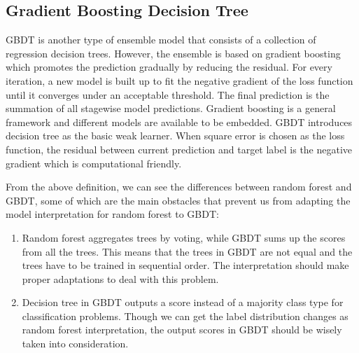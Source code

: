 
\subsection{Gradient Boosting Decision Tree}
GBDT is another type of ensemble model that consists of a collection of 
regression decision trees.
However, the ensemble is based on gradient boosting which promotes the prediction gradually by reducing the residual.
For every iteration, a new model is built up to fit the negative gradient of the loss function until it converges under an acceptable threshold. 
The final prediction is the summation of all stagewise model predictions. Gradient boosting is a general framework and different models 
are available to be embedded. GBDT introduces decision tree as the basic weak learner.  When square error is chosen as the 
loss function, the residual between current prediction and target label is the negative gradient which is computational friendly.

From the above definition, we can see the differences between random forest and GBDT, some of which are the main obstacles that prevent us from adapting 
the model interpretation for random forest to GBDT:
\begin{enumerate}
\item Random forest aggregates trees by voting, while GBDT sums up the scores 
from all the trees. This means that the trees in GBDT are not equal
and the trees have to be trained in sequential order. 
The interpretation should make proper adaptations to deal with this problem.
\item Decision tree in GBDT outputs a score instead of a majority class type for classification problems. Though we can get the label 
distribution changes as random forest interpretation, the output scores in GBDT should be wisely taken into consideration.
\end{enumerate}

